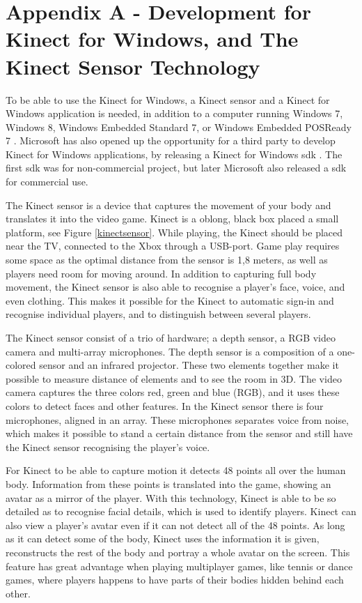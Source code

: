 \appendix

\section*{Appendix A - Development for Kinect for Windows, and The Kinect Sensor Technology}
\label{app:kinectsensortech}

To be able to use the Kinect for Windows, a Kinect sensor and a Kinect for Windows application is needed, in addition to a computer running Windows 7, Windows 8, Windows Embedded Standard 7, or Windows Embedded POSReady 7 \cite{kinectforwindows}. Microsoft has also opened up the opportunity for a third party to develop Kinect for Windows applications, by releasing a Kinect for Windows \ac{sdk} \cite{kinectforwindows}. The first \ac{sdk} was for non-commercial project, but later Microsoft also released a \ac{sdk} for commercial use. 

The Kinect sensor is a device that captures the movement of your body and translates it into the video game. Kinect is a oblong, black box placed a small platform, see Figure \ref{kinectsensor}. While playing, the Kinect should be placed near the TV, connected to the Xbox through a USB-port. Game play requires some space as the optimal distance from the sensor is 1,8 meters, as well as players need room for moving around. In addition to capturing full body movement, the Kinect sensor is also able to recognise a player's face, voice, and even clothing. This makes it possible for the Kinect to automatic sign-in and recognise individual players, and to distinguish between several players. 

The Kinect sensor consist of a trio of hardware; a depth sensor, a RGB video camera and multi-array microphones. The depth sensor is a composition of a one-colored sensor and an infrared projector. These two elements together make it possible to measure distance of elements and to see the room in 3D. The video camera captures the three colors red, green and blue (RGB), and it uses these colors to detect faces and other features. In the Kinect sensor there is four microphones, aligned in an array. These microphones separates voice from noise, which makes it possible to stand a certain distance from the sensor and still have the Kinect sensor recognising the player's voice.
 
For Kinect to be able to capture motion it detects 48 points all over the human body. Information from these points is translated into the game, showing an avatar as a mirror of the player. With this technology, Kinect is able to be so detailed as to recognise facial details, which is used to identify players. Kinect can also view a player's avatar even if it can not detect all of the 48 points. As long as it can detect some of the body, Kinect uses the information it is given, reconstructs the rest of the body and portray a whole avatar on the screen. This feature has great advantage when playing multiplayer games, like tennis or dance games, where players happens to have parts of their bodies hidden behind each other.

